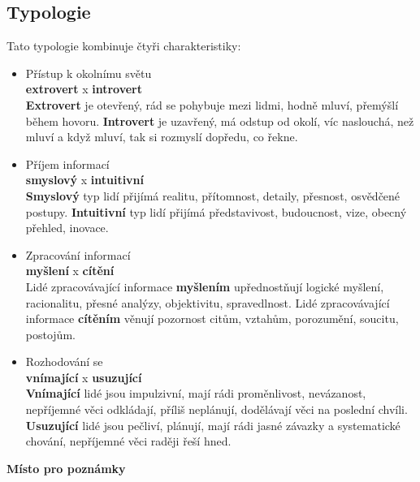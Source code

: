 \documentclass[a4paper,12pt]{report}
\begin{document}
\begin{samepage}
\subsection*{Typologie}
Tato typologie kombinuje čtyři charakteristiky:
\begin{itemize}
 \item Přístup k okolnímu světu\\
    \textbf{extrovert} x \textbf{introvert}\\
    \textbf{Extrovert} je otevřený, rád se pohybuje mezi lidmi, hodně mluví, přemýšlí během hovoru. \textbf{Introvert} je uzavřený, má odstup od okolí, víc naslouchá, než mluví a když mluví, tak si rozmyslí dopředu, co řekne.
    
 \item Příjem informací\\
    \textbf{smyslový} x \textbf{intuitivní}\\
    \textbf{Smyslový} typ lidí přijímá realitu, přítomnost, detaily, přesnost, osvědčené postupy. \textbf{Intuitivní} typ lidí přijímá představivost, budoucnost, vize, obecný přehled, inovace.
 \item Zpracování informací\\
    \textbf{myšlení} x \textbf{cítění}\\
    Lidé zpracovávající informace \textbf{myšlením} upřednostňují logické myšlení, racionalitu, přesné analýzy, objektivitu, spravedlnost. Lidé zpracovávající informace \textbf{cítěním} věnují pozornost citům, vztahům, porozumění, soucitu, postojům.
 \item Rozhodování se\\
    \textbf{vnímající} x \textbf{usuzující}\\
    \textbf{Vnímající} lidé jsou impulzivní, mají rádi proměnlivost, nevázanost, nepříjemné věci odkládají, příliš neplánují, dodělávají věci na poslední chvíli. \textbf{Usuzující} lidé jsou pečliví, plánují, mají rádi jasné závazky a systematické chování, nepříjemné věci raději řeší hned.
\end{itemize}
\end{samepage}\pagelogos
\begin{samepage}\begin{flushleft}
\end{flushleft}
\textbf{Místo pro poznámky}
\vspace{3cm}\pagelogos
\end{samepage}
\end{document}
